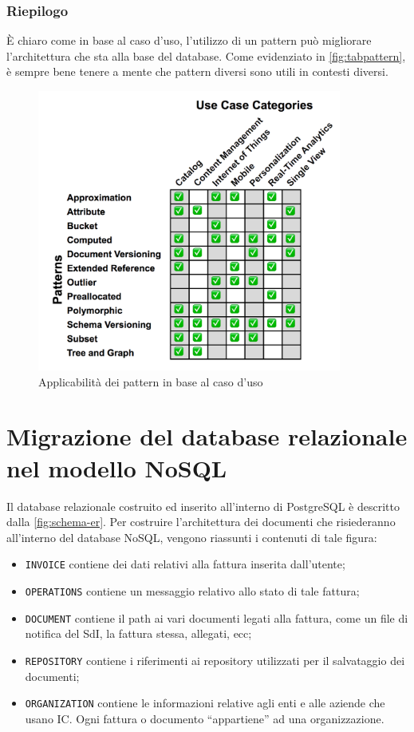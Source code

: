 \subsubsection{Riepilogo}
È chiaro come in base al caso d'uso, l'utilizzo di un pattern può migliorare l'architettura che sta alla base del database. Come evidenziato in \autoref{fig:tabpattern}, è sempre bene tenere a mente che pattern diversi sono utili in contesti diversi.

\begin{figure}[htbp]
\begin{center}
\includegraphics[height=25em]{immagini/patterns-table.png}
\caption{Applicabilità dei pattern in base al caso d'uso \cite{site:mongoDataModeling}}
\label{fig:tabpattern}
\end{center}
\end{figure}

\section{Migrazione del database relazionale nel modello NoSQL}
Il database relazionale costruito ed inserito all'interno di PostgreSQL è descritto dalla \autoref{fig:schema-er}. Per costruire l'architettura dei documenti che risiederanno all'interno del database NoSQL, vengono riassunti i contenuti di tale figura:\\
\begin{itemize}
    \item \texttt{INVOICE} contiene dei dati relativi alla fattura inserita dall'utente;
    \item \texttt{OPERATIONS} contiene un messaggio relativo allo stato di tale fattura;
    \item \texttt{DOCUMENT} contiene il path ai vari documenti legati alla fattura, come un file di notifica del SdI, la fattura stessa, allegati, ecc;
    \item \texttt{REPOSITORY} contiene i riferimenti ai repository utilizzati per il salvataggio dei documenti;
    \item \texttt{ORGANIZATION} contiene le informazioni relative agli enti e alle aziende che usano IC. Ogni fattura o documento ``appartiene'' ad una organizzazione.
\end{itemize}

